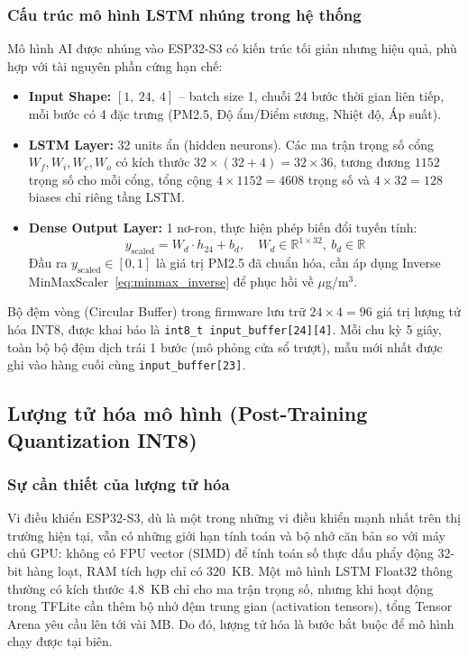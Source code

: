 \documentclass[12pt,a4paper]{article}
\begin{document}
\subsubsection{Cấu trúc mô hình LSTM nhúng trong hệ thống}

Mô hình AI được nhúng vào ESP32-S3 có kiến trúc tối giản nhưng hiệu quả, phù hợp với tài nguyên phần cứng hạn chế:

\begin{itemize}
    \item \textbf{Input Shape:} $[1,\ 24,\ 4]$ -- batch size 1, chuỗi 24 bước thời gian liên tiếp, mỗi bước có 4 đặc trưng (PM2.5, Độ ẩm/Điểm sương, Nhiệt độ, Áp suất).
    \item \textbf{LSTM Layer:} 32 units ẩn (hidden neurons). Các ma trận trọng số cổng $W_f, W_i, W_c, W_o$ có kích thước $32 \times (32 + 4) = 32 \times 36$, tương đương $1152$ trọng số cho mỗi cổng, tổng cộng $4 \times 1152 = 4608$ trọng số và $4 \times 32 = 128$ biases chỉ riêng tầng LSTM.
    \item \textbf{Dense Output Layer:} 1 nơ-ron, thực hiện phép biến đổi tuyến tính:
        \begin{equation}
            y_{\text{scaled}} = W_d \cdot h_{24} + b_d, \quad W_d \in \mathbb{R}^{1 \times 32},\ b_d \in \mathbb{R}
            \label{eq:dense_output}
        \end{equation}
        Đầu ra $y_{\text{scaled}} \in [0, 1]$ là giá trị PM2.5 đã chuẩn hóa, cần áp dụng Inverse MinMaxScaler~\eqref{eq:minmax_inverse} để phục hồi về $\mu$g/m$^3$.
\end{itemize}

Bộ đệm vòng (Circular Buffer) trong firmware lưu trữ $24 \times 4 = 96$ giá trị lượng tử hóa INT8, được khai báo là \texttt{int8\_t input\_buffer[24][4]}. Mỗi chu kỳ 5 giây, toàn bộ bộ đệm dịch trái 1 bước (mô phỏng cửa sổ trượt), mẫu mới nhất được ghi vào hàng cuối cùng \texttt{input\_buffer[23]}.

\subsection{Lượng tử hóa mô hình (Post-Training Quantization INT8)}

\subsubsection{Sự cần thiết của lượng tử hóa}

Vi điều khiển ESP32-S3, dù là một trong những vi điều khiển mạnh nhất trên thị trường hiện tại, vẫn có những giới hạn tính toán và bộ nhớ căn bản so với máy chủ GPU: không có FPU vector (SIMD) để tính toán số thực dấu phẩy động 32-bit hàng loạt, RAM tích hợp chỉ có $320$~KB. Một mô hình LSTM Float32 thông thường có kích thước $4.8$~KB chỉ cho ma trận trọng số, nhưng khi hoạt động trong TFLite cần thêm bộ nhớ đệm trung gian (activation tensors), tổng Tensor Arena yêu cầu lên tới vài MB. Do đó, lượng tử hóa là bước bắt buộc để mô hình chạy được tại biên.
\end{document}
